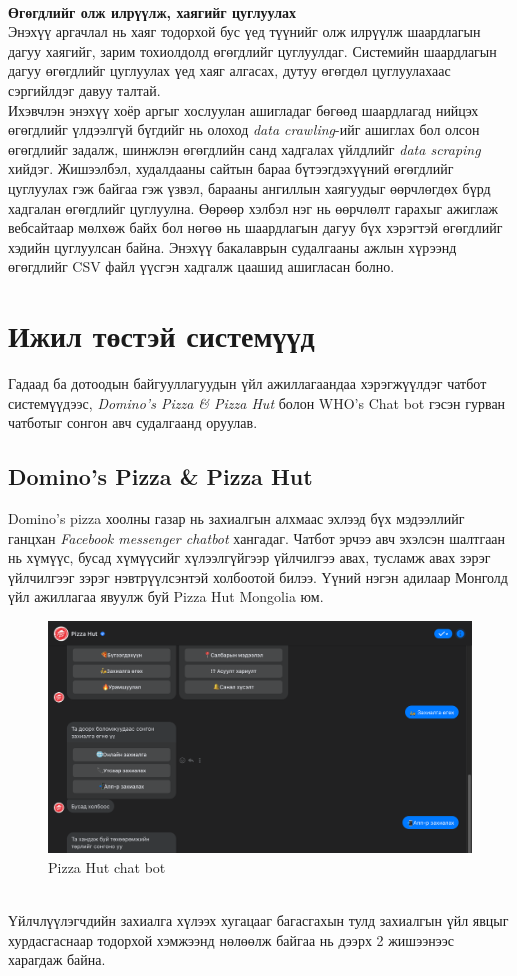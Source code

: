 \\\textbf{Өгөгдлийг олж илрүүлж, хаягийг цуглуулах}
\\Энэхүү аргачлал нь хаяг тодорхой бус үед түүнийг олж илрүүлж шаардлагын дагуу хаягийг, зарим тохиолдолд өгөгдлийг цуглуулдаг. Системийн шаардлагын дагуу өгөгдлийг цуглуулах үед хаяг алгасах, дутуу өгөгдөл цуглуулахаас сэргийлдэг давуу талтай. 
\\Ихэвчлэн энэхүү хоёр аргыг хослуулан ашигладаг бөгөөд шаардлагад нийцэх өгөгдлийг үлдээлгүй бүгдийг нь олоход \textit{data crawling}-ийг ашиглах бол олсон өгөгдлийг задалж, шинжлэн өгөгдлийн санд хадгалах үйлдлийг \textit{data scraping} хийдэг. Жишээлбэл, худалдааны сайтын бараа бүтээгдэхүүний өгөгдлийг цуглуулах гэж байгаа гэж үзвэл, барааны ангиллын хаягуудыг өөрчлөгдөх бүрд хадгалан өгөгдлийг цуглуулна. Өөрөөр хэлбэл нэг нь өөрчлөлт гарахыг ажиглаж вебсайтаар мөлхөж байх бол нөгөө нь шаардлагын дагуу бүх хэрэгтэй өгөгдлийг хэдийн цуглуулсан байна.  
Энэхүү бакалаврын судалгааны ажлын хүрээнд өгөгдлийг CSV файл үүсгэн хадгалж цаашид ашигласан болно. 
\section{Ижил төстэй системүүд}
Гадаад ба дотоодын байгууллагуудын үйл ажиллагаандаа хэрэгжүүлдэг чатбот системүүдээс, \textit{Domino's Pizza \& Pizza Hut} болон {WHO's Chat bot} гэсэн гурван чатботыг сонгон авч судалгаанд оруулав. 
\subsection{Domino's Pizza \& Pizza Hut}
Domino's pizza хоолны газар нь захиалгын алхмаас эхлээд бүх мэдээллийг ганцхан \textit{Facebook messenger chatbot} хангадаг. Чатбот эрчээ авч эхэлсэн шалтгаан нь хүмүүс, бусад хүмүүсийг хүлээлгүйгээр үйлчилгээ авах, тусламж авах зэрэг үйлчилгээг зэрэг нэвтрүүлсэнтэй холбоотой билээ. Үүний нэгэн адилаар Монголд үйл ажиллагаа явуулж буй Pizza Hut Mongolia юм.
\begin{figure}[ht]
  \centering
  \includegraphics[width=\textwidth]{images/pizzaHut.png}
  \caption{Pizza Hut chat bot}\label{fig:chatbotPizzahut}
\end{figure}
\\Үйлчлүүлэгчдийн захиалга хүлээх хугацааг багасгахын тулд захиалгын үйл явцыг хурдасгаснаар тодорхой хэмжээнд нөлөөлж байгаа нь дээрх 2 жишээнээс харагдаж байна.

